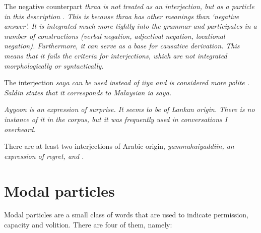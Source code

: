 The negative counterpart \em thraa \em is not treated as an interjection, but as a particle in this description . This is because \em thraa \em has other meanings than `negative answer'. It is integrated much more tightly into the  grammar and participates in a number of constructions (verbal negation, adjectival negation, locational negation). Furthermore, it can serve as a base for causative derivation. This means that it fails the criteria for interjections, which are not integrated morphologically or syntactically.


The interjection \em saya \em  can be used instead of \em iiya \em and is considered more polite \citep[55]{Saldin2001}. Saldin states that it corresponds to Malaysian \em ia saya\em.


\em Ayyoo\em n is an expression of surprise. It seems to be of Lankan origin. There is no instance of it in the corpus, but it was frequently used in conversations I overheard.
% 
% 
% 
% 
% 
% 

There are at least two interjections of Arabic origin,  \em yammuhaiyaddiin, \em an expression of regret, and  .


\section{Modal particles}\label{sec:wc:Modalparticles}
Modal particles are a small class of words that are  used to indicate   permission, capacity and volition. There are four of them, namely:

